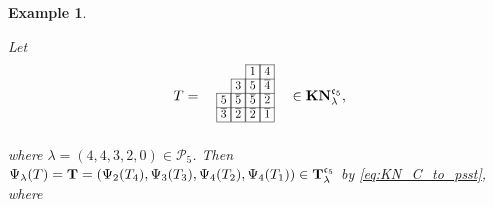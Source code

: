\documentclass[leqno,11pt]{amsart}
\newtheorem{ex}[thm]{\bf Example}
\numberwithin{equation}{section}
\newcommand{\cP}{\mathscr{P}}
\newcommand{\ov}{\overline}
\newcommand{\mf}{\mathfrak}
\newcommand{\la}{\lambda}
\begin{document}
\begin{ex}\label{ex:embedding-1}
{\rm
Let  \vskip 2mm
$$
T=\quad
\resizebox{.12\hsize}{!}
{\def\lr#1{\multicolumn{1}{|@{\hspace{.75ex}}c@{\hspace{.75ex}}|}{\raisebox{-.04ex}{$#1$}}}\raisebox{-.6ex}
{$\begin{array}{cccc}
\cline{3-3}\cline{4-4}
& & \lr{1} &\lr{4}\\
\cline{2-2}\cline{3-3}\cline{4-4}
& \lr{3} & \lr{5} &\lr{\ov 4}\\
\cline{1-1}\cline{2-2}\cline{3-3}\cline{4-4}
\lr{5}&\lr{\ov 5} & \lr{\ov 5}&\lr{\ov 2}\\
\cline{1-1}\cline{2-2}\cline{3-3}\cline{4-4}
\lr{\ov 3}&\lr{\ov 2} & \lr{\ov 2}&\lr{\ov 1}\\
\cline{1-1}\cline{2-2}\cline{3-3}\cline{4-4}\\
\end{array}$}}\quad  \in {\bf KN}^{\mf c_5}_{\la},
$$ 
\noindent where $\la=(4,4,3,2,0)\in \cP_5$. Then $\Psi_{\la}(T)={\bf T}=(\Psi_2(T_4),\Psi_3(T_3),\Psi_4(T_2),\Psi_4(T_1))\in {\bf T}^{\mf c_5}_{\la}$ by \eqref{eq:KN_C_to_psst}, where 

}
\end{ex}
\end{document}
